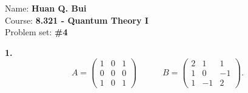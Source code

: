 \documentclass{article}
\theoremstyle{definition}
\begin{document}
\begin{framed}
\noindent Name: \textbf{Huan Q. Bui}\\
Course: \textbf{8.321 - Quantum Theory I}\\
Problem set: \textbf{\#4}
\end{framed}
	




\noindent \textbf{1. }
\begin{equation*}
A = \begin{pmatrix}
1 & 0 & 1\\
0 & 0 & 0\\
1 & 0 & 1
\end{pmatrix} 
\quad\quad \quad 
B = \begin{pmatrix}
2 & 1 & 1 \\
1 & 0 & -1\\
1 & -1 & 2
\end{pmatrix}.
\end{equation*}
\end{document}
